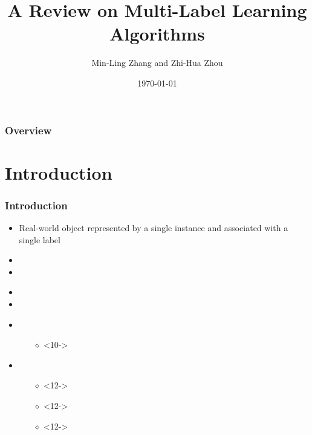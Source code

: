 \documentclass{beamer}
\title[Large-Scale Data Analysis Techniques]{A Review on Multi-Label Learning Algorithms} %
\author[Sissy Themeli, Nikiforos Pittaras]{Min-Ling Zhang and Zhi-Hua Zhou} %
\institute[DI-UOA] %
{
	IEEE TRANSACTIONS ON KNOWLEDGE AND DATA ENGINEERING\\ %
	\medskip
}
\date{\today} %
\begin{document}
	
	\begin{frame}
	\titlepage %
\end{frame}

\begin{frame}
\frametitle{Overview} %
\tableofcontents %
\end{frame}


\section{Introduction} %
\begin{frame}
\frametitle{Introduction}

\begin{itemize}
\item <3-> Real-world object represented by a single instance and associated with a single label
\item <4-> 
\item <5-> 
\end{itemize}
\begin{itemize}
\item <7-> 
\item <8-> 
\end{itemize} 

\begin{itemize}
\item <10-> 
\begin{itemize}
	\item [$\diamond$]<10->
\end{itemize}
\item <11-> 
\begin{itemize}
	\item [$\diamond$]<12-> 
	\item [$\diamond$]<12-> 
	\item [$\diamond$]<12->
\end{itemize}
\end{itemize}

\end{frame}
\end{document}
